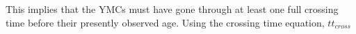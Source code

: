This implies that the YMCs must have gone through at least one full crossing time before their presently observed age. Using the crossing time equation, $tt_{cross}$